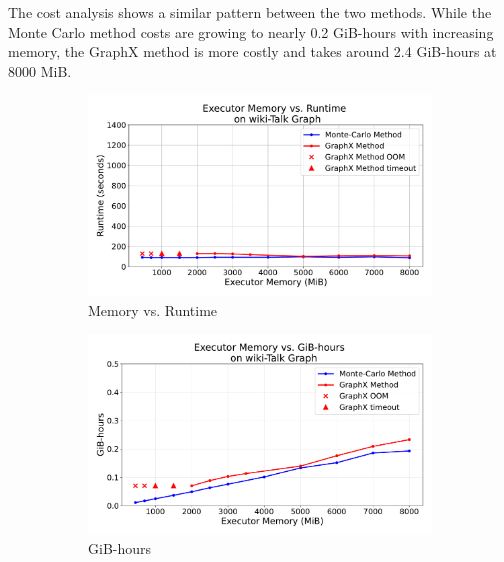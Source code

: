 The cost analysis shows a similar pattern between the two methods. While the Monte Carlo method costs are growing to nearly 0.2 GiB-hours with increasing memory, the GraphX method is more costly and takes around 2.4 GiB-hours at 8000 MiB. 

\begin{figure}[H]
    \centering
    \begin{subfigure}[t]{0.5\linewidth}
        \centering
        \includegraphics[width=\linewidth]{images/plots/wiki-Talk/memory_vs_runtime_wiki_talk.pdf}
        \caption{Memory vs. Runtime}
        \label{fig:wikirun}
    \end{subfigure}\hfill
    \begin{subfigure}[t]{0.5\linewidth}
        \centering
        \includegraphics[width=\linewidth]{images/plots/wiki-Talk/gbhrs_nodes_wiki_talk.pdf}
        \caption{GiB-hours}
        \label{fig:wikigibhrs}
    \end{subfigure}
    \begin{subfigure}[t]{0.5\linewidth}
        \centering

\end{subfigure}
\end{figure}
